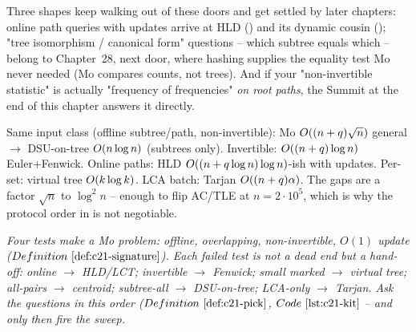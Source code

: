 \begin{notebox}
Three shapes keep walking out of these doors and get settled by later
chapters: online path queries with updates arrive at HLD () and its
dynamic cousin (); "tree isomorphism / canonical form" questions --
which subtree equals which -- belong to Chapter~28, next door, where hashing
supplies the equality test Mo never needed (Mo compares counts, not trees).
And if your "non-invertible statistic" is actually "frequency of frequencies"
\emph{on root paths}, the Summit at the end of this chapter answers it directly.
\end{notebox}

\begin{complexitybox}
Same input class (offline subtree/path, non-invertible): Mo
\(O((n+q)\sqrt n)\) general \(\to\) DSU-on-tree \(O(n\log n)\) (subtrees
only).  Invertible: \(O((n+q)\log n)\) Euler+Fenwick.  Online paths: HLD
\(O((n+q\log n)\log n)\)-ish with updates.  Per-set: virtual tree
\(O(k\log k)\).  LCA batch: Tarjan \(O((n+q)\alpha)\).  The gaps are a
factor \(\sqrt n\) to \(\log^2 n\) -- enough to flip AC/TLE at \(n=2\cdot10^5\),
which is why the protocol order in  is not negotiable.
\end{complexitybox}

\begin{recallbox}
\emph{Four tests make a Mo problem: offline, overlapping, non-invertible,
\(O(1)\) update (\(\defref{c21-signature}\)).  Each failed test is not a dead
end but a hand-off: online \(\to\) HLD/LCT; invertible \(\to\) Fenwick; small
marked \(\to\) virtual tree; all-pairs \(\to\) centroid; subtree-all \(\to\)
DSU-on-tree; LCA-only \(\to\) Tarjan.  Ask the questions in this order
(\(\defref{c21-pick}\), \(\coderef{c21-kit}\) -- and only then fire the
sweep.}
\end{recallbox}
